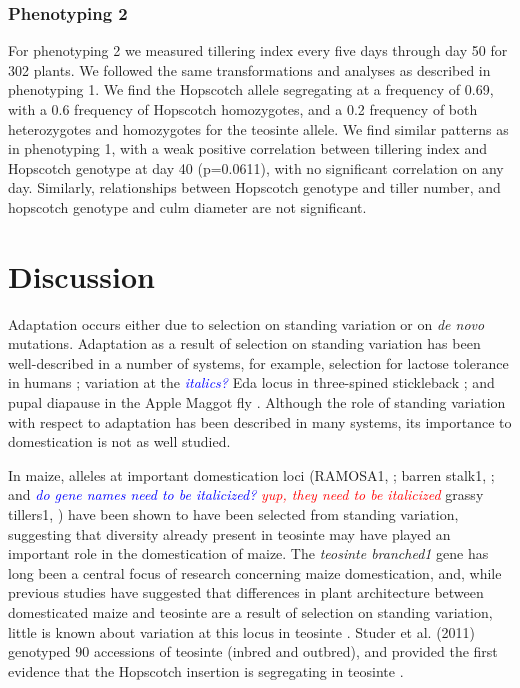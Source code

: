 \documentclass[12pt]{article}
\newcommand{\jri}[1]{\textcolor{blue}{ \emph{\scriptsize  #1}} }
\newcommand{\mbh}[1]{\textcolor{red}{ \emph{\scriptsize  #1}} }
\begin{document}
\subsubsection*{Phenotyping 2}

For phenotyping 2 we measured tillering index every five days through day 50 for 302 plants. We followed the same transformations and analyses as described in phenotyping 1. We find the Hopscotch allele segregating at a frequency of 0.69, with a 0.6 frequency of Hopscotch homozygotes, and a 0.2 frequency of both heterozygotes and homozygotes for the teosinte allele. We find similar patterns as in phenotyping 1, with a weak positive correlation between tillering index and Hopscotch genotype at day 40 (p=0.0611), with no significant correlation on any day. Similarly, relationships between Hopscotch genotype and tiller number, and hopscotch genotype and culm diameter are not significant. 


\section*{Discussion}

Adaptation occurs either due to selection on standing variation or on \emph{de novo} mutations. Adaptation as a result of selection on standing variation has been well-described in a number of systems, for example, selection for lactose tolerance in humans \cite{Plantinga et al 2012, Tishkoff et al 2007}; variation at the \jri{italics?} Eda locus in three-spined stickleback \cite{Kitano et al 2008, Colosimo et al 2005}; and pupal diapause in the Apple Maggot fly \cite{Feder et al 2003}. Although the role of standing variation with respect to adaptation has been described in many systems, its importance to domestication is not as well studied. 

In maize, alleles at important domestication loci (RAMOSA1, \cite{Sigmon and Vollbrecht 2010}; barren stalk1, \cite{Gallavotti et al 2004}; and \jri{do gene names need to be italicized?} \mbh{yup, they need to be italicized} grassy tillers1, \cite{Whipple et al 2011}) have been shown to have been selected from standing variation, suggesting that diversity already present in teosinte may have played an important role in the domestication of maize. The \emph{teosinte branched1} gene has long been a central focus of research concerning maize domestication, and, while previous studies have suggested that differences in plant architecture between domesticated maize and teosinte are a result of selection on standing variation, little is known about variation at this locus in teosinte \cite{Clark et al 2006, Studer et al 2011}. Studer et al. (2011) genotyped 90 accessions of teosinte (inbred and outbred), and provided the first evidence that the Hopscotch insertion is segregating in teosinte \cite{Studer et al 2011}. 
\end{document}
